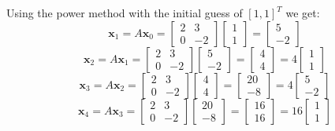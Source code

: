 \documentclass[12pt]{article}
\newenvironment{problems}{\begin{list}{}{\setlength{\labelwidth}{.7in}}}{\end{list}}
\begin{document}
\begin{problems}
Using the power method with the initial guess of $[1,1]^T$ we get:
\[\textbf{x}_1=A\textbf{x}_0=
\begin{bmatrix}
2 & 3\\
0&-2
\end{bmatrix}
\begin{bmatrix}
1\\
1
\end{bmatrix}=
\begin{bmatrix}
5\\
-2
\end{bmatrix}
\]
\[\textbf{x}_2=A\textbf{x}_1=
\begin{bmatrix}
2 & 3\\
0&-2
\end{bmatrix}
\begin{bmatrix}
5\\
-2
\end{bmatrix}=
\begin{bmatrix}
4\\
4
\end{bmatrix}=4
\begin{bmatrix}
1\\
1
\end{bmatrix}
\]
\[\textbf{x}_3=A\textbf{x}_2=
\begin{bmatrix}
2 & 3\\
0&-2
\end{bmatrix}
\begin{bmatrix}
4\\
4
\end{bmatrix}=
\begin{bmatrix}
20\\
-8
\end{bmatrix}=4
\begin{bmatrix}
5\\
-2
\end{bmatrix}
\]
\[\textbf{x}_4=A\textbf{x}_3=
\begin{bmatrix}
2 & 3\\
0&-2
\end{bmatrix}
\begin{bmatrix}
20\\
-8
\end{bmatrix}=
\begin{bmatrix}
16\\
16
\end{bmatrix}=16
\begin{bmatrix}
1\\
1
\end{bmatrix}
\]


\end{problems}
\end{document}
